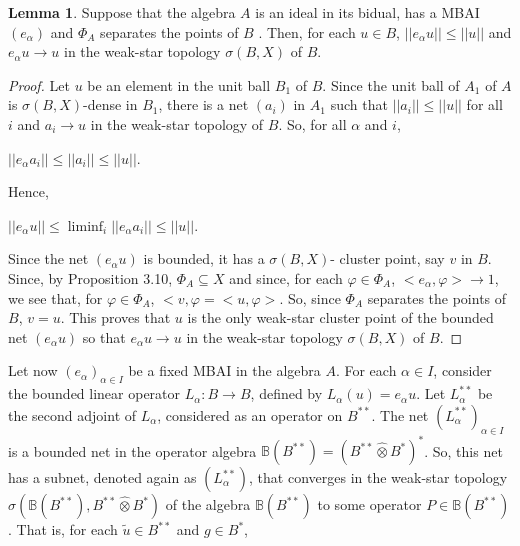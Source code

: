 \documentclass[12pt, twoside, leqno]{article}
\theoremstyle{definition}
\newtheorem{lemma}[theorem]{Lemma}
\theoremstyle{definition}
\numberwithin{equation}{section}
\begin{document}
\begin{lemma}
	Suppose that the algebra $ A $ is an ideal in its bidual, has a MBAI $ (e_{\alpha}) $ and $ \Phi_{A} $ separates the points of $ B $ . Then, for each $ u\in B $, $ ||e_{\alpha}u||\leq ||u||
	$ and $ e_{\alpha}u\rightarrow u $ in the weak-star topology $ \sigma (B,X) $ of $ B $.
\end{lemma}
\begin{proof}
Let $ u $ be an element in the unit ball $ B_{1} $ of $ B $. Since the unit ball of $ A_{1} $ of $ A $ is $ \sigma(B,X) $-dense in $ B_{1} $, there is a net $ (a_{i}) $ in $ A_{1} $ such that $ ||a_{i}||\leq ||u|| $ for all $ i $ and $ a_{i}\rightarrow u $ in the weak-star topology of $ B $. So, for all $ \alpha $ and $ i $,\vspace{2mm}

$ ||e_{\alpha}a_{i}||\leq ||a_{i}||\leq ||u|| $.\vspace{2mm}

\noindent Hence, \vspace{2mm}

$ ||e_{\alpha}u||\leq\liminf_{i}||e_{\alpha}a_{i}||\leq ||u|| $. \vspace{3mm}

\noindent Since the net $ (e_{\alpha}u) $ is bounded, it has a $\sigma(B,X)$- cluster point, say $ v $ in $ B $. Since, by Proposition 3.10, $ \Phi_{A}\subseteq X $ and since, for each $ \varphi\in \Phi_{A} $, $ <e_{\alpha},\varphi>\rightarrow 1 $, we see that, for $ \varphi\in \Phi_{A} $, $ <v,\varphi=<u,\varphi> $. So, since $ \Phi_{A} $ separates the points of $ B $, $ v=u $. This proves that $ u $ is the only weak-star cluster point of the bounded net $ (e_{\alpha}u) $ so that $ e_{\alpha}u\rightarrow u $ in the weak-star topology $ \sigma(B,X) $ of $ B $.  

\end{proof}
Let now $ (e_{\alpha})_{\alpha\in I} $ be a fixed MBAI in the algebra $ A $. For each $ \alpha\in I $, consider the bounded linear operator $ L_{\alpha}:B\rightarrow B $, defined by $ L_{\alpha}(u)=e_{\alpha}u $. Let $ L_{\alpha}^{**} $ be the second adjoint of $ L_{\alpha} $, considered as an operator on $ B^{**} $. The net $ (L_{\alpha}^{**})_{\alpha\in I} $ is a bounded net in the operator algebra $ \mathbb{B}(B^{**})=(B^{**}\hat{\otimes}B^{*})^{*} $. So, this net has a subnet, denoted again as $ (L_{\alpha}^{**}) $, that converges in the weak-star topology $ \sigma(\mathbb{B}(B^{**}),B^{**}\hat{\otimes}B^{*}) $ of the algebra $ \mathbb{B}(B^{**}) $ to some operator $ P\in \mathbb{B}(B^{**}) $. That is, for each $ \tilde{u}\in B^{**} $ and $ g\in B^{*} $,\vspace{2mm}
\end{document}
